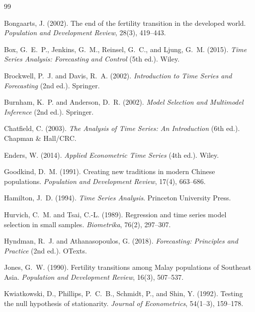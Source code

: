 \documentclass[12pt,a4paper]{article}
\begin{document}
\clearpage

\begin{thebibliography}{99}

Bongaarts, J. (2002). The end of the fertility transition in the developed world.
\textit{Population and Development Review}, 28(3), 419--443.

Box, G.\ E.\ P., Jenkins, G.\ M., Reinsel, G.\ C., and Ljung, G.\ M. (2015).
\textit{Time Series Analysis: Forecasting and Control} (5th ed.). Wiley.

Brockwell, P.\ J. and Davis, R.\ A. (2002).
\textit{Introduction to Time Series and Forecasting} (2nd ed.). Springer.

Burnham, K.\ P. and Anderson, D.\ R. (2002).
\textit{Model Selection and Multimodel Inference} (2nd ed.). Springer.

Chatfield, C. (2003). \textit{The Analysis of Time Series: An Introduction}
(6th ed.). Chapman \& Hall/CRC.

Enders, W. (2014). \textit{Applied Econometric Time Series} (4th ed.). Wiley.

Goodkind, D.\ M. (1991). Creating new traditions in modern Chinese populations.
\textit{Population and Development Review}, 17(4), 663--686.

Hamilton, J.\ D. (1994). \textit{Time Series Analysis}. Princeton University Press.

Hurvich, C.\ M. and Tsai, C.-L. (1989). Regression and time series model selection
in small samples. \textit{Biometrika}, 76(2), 297--307.

Hyndman, R.\ J. and Athanasopoulos, G. (2018).
\textit{Forecasting: Principles and Practice} (2nd ed.). OTexts.

Jones, G.\ W. (1990). Fertility transitions among Malay populations of Southeast Asia.
\textit{Population and Development Review}, 16(3), 507--537.

Kwiatkowski, D., Phillips, P.\ C.\ B., Schmidt, P., and Shin, Y. (1992).
Testing the null hypothesis of stationarity.
\textit{Journal of Econometrics}, 54(1--3), 159--178.


\end{thebibliography}
\end{document}
